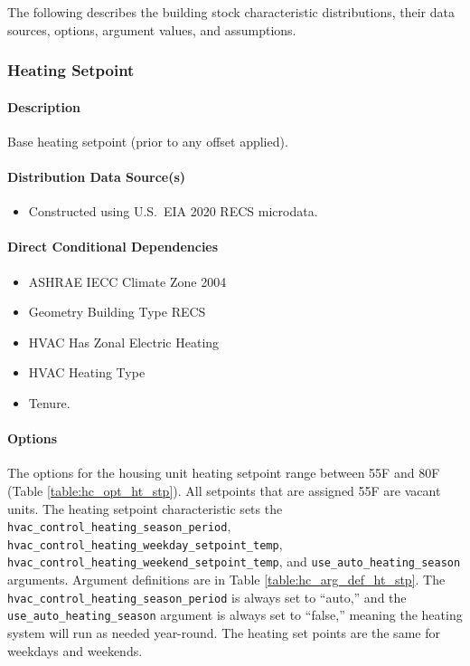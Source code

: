 The following describes the building stock characteristic distributions, their data sources, options, argument values, and assumptions.

\subsubsection{Heating Setpoint}
\paragraph{Description}
Base heating setpoint (prior to any offset applied).

\paragraph{Distribution Data Source(s)}
\begin{itemize}
\item Constructed using U.S.~EIA 2020 RECS microdata.
\end{itemize}

\paragraph{Direct Conditional Dependencies}
\begin{itemize}
    \item ASHRAE IECC Climate Zone 2004
    \item Geometry Building Type RECS
    \item HVAC Has Zonal Electric Heating
    \item HVAC Heating Type
    \item Tenure.
\end{itemize}

\paragraph{Options}
The options for the housing unit heating setpoint range between 55\degree F and 80\degree F (Table \ref{table:hc_opt_ht_stp}). All setpoints that are assigned 55\degree F are vacant units. The heating setpoint characteristic sets the \texttt{hvac\_control\_heating\_season\_period}, \texttt{hvac\_control\_heating\_weekday\_setpoint\_temp}, \texttt{hvac\_control\_heating\_weekend\_setpoint\_temp}, and \texttt{use\_auto\_heating\_season} arguments. Argument definitions are in Table \ref{table:hc_arg_def_ht_stp}. The \texttt{hvac\_control\_heating\_season\_period} is always set to ``auto,'' and the \texttt{use\_auto\_heating\_season} argument is always set to ``false,'' meaning the heating system will run as needed year-round. The heating set points are the same for weekdays and weekends.

